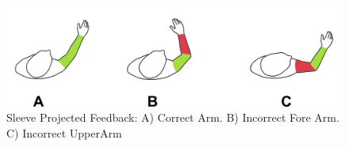 



\begin{figure}[!b]
    \begin{center}
        \includegraphics[width=\columnwidth]{imgs/armvisualfeedback.png}
    \end{center}
    \caption{Sleeve Projected Feedback: A) Correct Arm. B) Incorrect Fore Arm. C) Incorrect UpperArm}
    \label{fig:vision}
\end{figure}